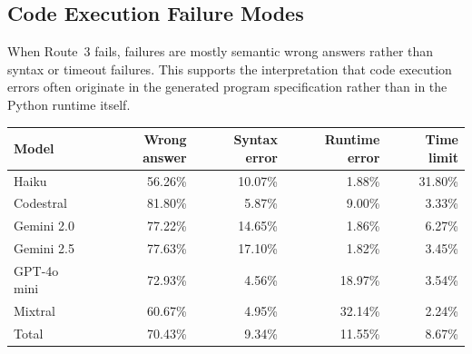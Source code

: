 \subsection{Code Execution Failure Modes}
\label{app:code_execution_failure_modes}

When Route~3 fails, failures are mostly semantic wrong answers rather than syntax or timeout failures. This supports the interpretation that code execution errors often originate in the generated program specification rather than in the Python runtime itself.

\begin{center}
\small
\begin{tabular}{lrrrr}
\toprule
Model & Wrong answer & Syntax error & Runtime error & Time limit \\
\midrule
Haiku & 56.26\% & 10.07\% & 1.88\% & 31.80\% \\
Codestral & 81.80\% & 5.87\% & 9.00\% & 3.33\% \\
Gemini 2.0 & 77.22\% & 14.65\% & 1.86\% & 6.27\% \\
Gemini 2.5 & 77.63\% & 17.10\% & 1.82\% & 3.45\% \\
GPT-4o mini & 72.93\% & 4.56\% & 18.97\% & 3.54\% \\
Mixtral & 60.67\% & 4.95\% & 32.14\% & 2.24\% \\
Total & 70.43\% & 9.34\% & 11.55\% & 8.67\% \\
\bottomrule
\end{tabular}
\label{tab:appendix_code_failure_modes}
\end{center}

